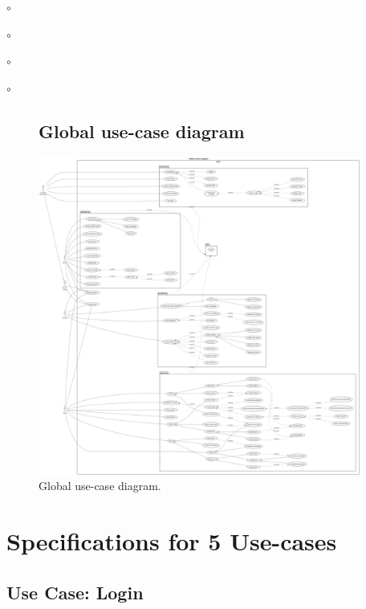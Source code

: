 \documentclass[]{uc2pfecaneva}
\begin{document}
\begin{list}{$\circ$}{}
\begin{list}{$\circ$}{}
\begin{list}{$\circ$}{}
\begin{list}{$\circ$}{}
\begin{figure}[ht]
        \subsection{Global use-case diagram}
        \centering
        \includegraphics[width=300pt]{images/GUCD}

        \caption{Global use-case diagram.}
    \end{figure}
    \clearpage


    \thispagestyle{empty}
    \begin{table}[h]
        \raggedright\section{Specifications for 5 Use-cases}

        \raggedright\subsection{Use Case: Login}

\end{table}
\end{list}
\end{list}
\end{list}
\end{list}
\end{document}
